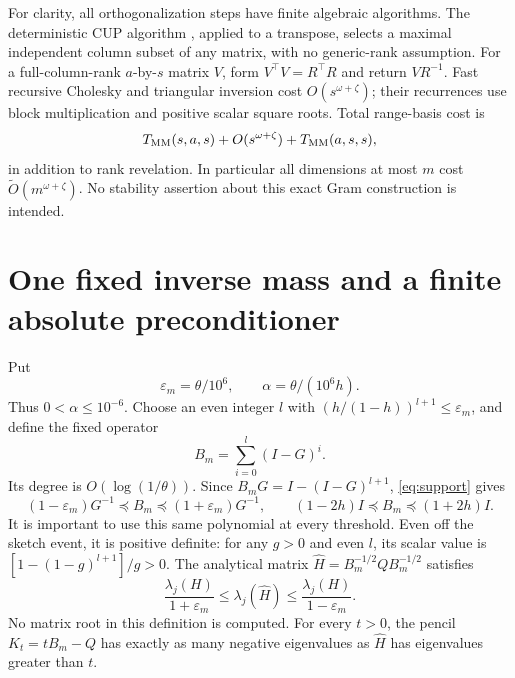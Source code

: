 \documentclass[11pt]{article}
\newcommand{\tO}{\widetilde O}
\newcommand{\MM}{T_{\rm MM}}
\begin{document}
For clarity, all orthogonalization steps have finite algebraic algorithms.
The deterministic CUP algorithm \cite{jps}, applied to a transpose,
selects a maximal independent column subset of any matrix, with no
generic-rank assumption. For a full-column-rank \(a\)-by-\(s\) matrix
\(V\), form \(V^\top V=R^\top R\) and return \(VR^{-1}\).
Fast recursive Cholesky and triangular inversion cost
\(O(s^{\omega+\zeta})\); their recurrences use block multiplication
and positive scalar square roots. Total range-basis cost is
\begin{equation}\label{eq:qr}
 \MM(s,a,s)+O(s^{\omega+\zeta})+\MM(a,s,s),
\end{equation}
in addition to rank revelation. In particular all dimensions at most
\(m\) cost \(\tO(m^{\omega+\zeta})\). No stability assertion about
this exact Gram construction is intended.

\section{One fixed inverse mass and a finite absolute preconditioner}
Put
\[
 \varepsilon_m=\theta/10^6,\qquad \alpha=\theta/(10^6h).
\]
Thus \(0<\alpha\leq10^{-6}\). Choose an even integer \(l\) with
\((h/(1-h))^{l+1}\leq\varepsilon_m\), and define the fixed operator
\begin{equation}\label{eq:mass}
 B_m=\sum_{i=0}^{l}(I-G)^i.
\end{equation}
Its degree is \(O(\log(1/\theta))\). Since
\(B_mG=I-(I-G)^{l+1}\), \eqref{eq:support} gives
\begin{equation}\label{eq:massbounds}
 (1-\varepsilon_m)G^{-1}\preceq B_m\preceq(1+\varepsilon_m)G^{-1},
 \qquad (1-2h)I\preceq B_m\preceq(1+2h)I.
\end{equation}
It is important to use this same polynomial at every threshold.
Even off the sketch event, it is positive definite: for any \(g>0\)
and even \(l\), its scalar value is
\([1-(1-g)^{l+1}]/g>0\).
The analytical matrix \(\widehat H=B_m^{-1/2}QB_m^{-1/2}\) satisfies
\begin{equation}\label{eq:hatcompare}
 \frac{\lambda_j(H)}{1+\varepsilon_m}
 \leq\lambda_j(\widehat H)
 \leq\frac{\lambda_j(H)}{1-\varepsilon_m}.
\end{equation}
No matrix root in this definition is computed. For every \(t>0\),
the pencil \(K_t=tB_m-Q\) has exactly as many negative eigenvalues
as \(\widehat H\) has eigenvalues greater than \(t\).
\end{document}
